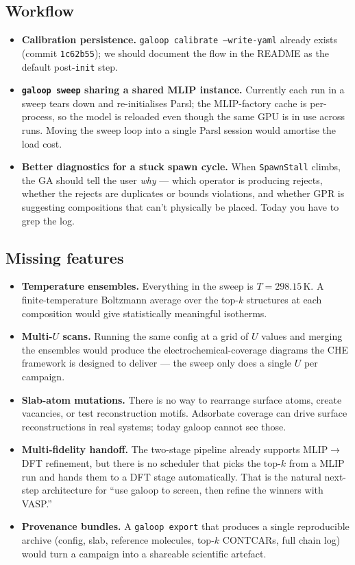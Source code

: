 \documentclass[11pt,letterpaper]{article}
\begin{document}
\subsection{Workflow}

\begin{itemize}
  \item \textbf{Calibration persistence.} \texttt{galoop calibrate
    --write-yaml} already exists (commit \texttt{1c62b55}); we
    should document the flow in the README as the default
    post-\texttt{init} step.
  \item \textbf{\texttt{galoop sweep} sharing a shared MLIP
    instance.} Currently each run in a sweep tears down and
    re-initialises Parsl; the MLIP-factory cache is per-process,
    so the model is reloaded even though the same GPU is in use
    across runs. Moving the sweep loop into a single Parsl session
    would amortise the load cost.
  \item \textbf{Better diagnostics for a stuck spawn cycle.} When
    \texttt{SpawnStall} climbs, the GA should tell the user
    \emph{why} — which operator is producing rejects, whether the
    rejects are duplicates or bounds violations, and whether GPR is
    suggesting compositions that can't physically be placed. Today
    you have to grep the log.
\end{itemize}

\subsection{Missing features}

\begin{itemize}
  \item \textbf{Temperature ensembles.} Everything in the sweep is
    $T = 298.15$\,K. A finite-temperature Boltzmann average over the
    top-$k$ structures at each composition would give statistically
    meaningful isotherms.
  \item \textbf{Multi-$U$ scans.} Running the same config at a grid
    of $U$ values and merging the ensembles would produce the
    electrochemical-coverage diagrams the CHE framework is designed
    to deliver — the sweep only does a single $U$ per campaign.
  \item \textbf{Slab-atom mutations.} There is no way to rearrange
    surface atoms, create vacancies, or test reconstruction motifs.
    Adsorbate coverage can drive surface reconstructions in real
    systems; today galoop cannot see those.
  \item \textbf{Multi-fidelity handoff.} The two-stage pipeline
    already supports MLIP$\to$DFT refinement, but there is no
    scheduler that picks the top-$k$ from a MLIP run and hands them
    to a DFT stage automatically. That is the natural next-step
    architecture for ``use galoop to screen, then refine the
    winners with VASP.''
  \item \textbf{Provenance bundles.} A \texttt{galoop export} that
    produces a single reproducible archive (config, slab, reference
    molecules, top-$k$ CONTCARs, full chain log) would turn a
    campaign into a shareable scientific artefact.
\end{itemize}
\end{document}
